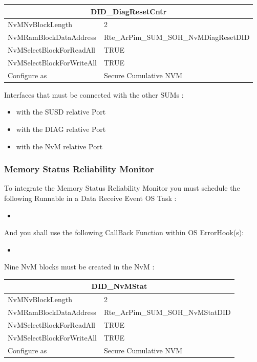 \begin{tabular}{|l|p{8cm}|}\hline
\multicolumn{2}{|c|}{\textbf{DID\_DiagResetCntr}}\\\hline
NvMNvBlockLength&2\\\hline
NvMRamBlockDataAddress&Rte\_ArPim\_SUM\_SOH\_NvMDiagResetDID\\\hline
NvMSelectBlockForReadAll&TRUE\\\hline
NvMSelectBlockForWriteAll&TRUE\\\hline
Configure as&Secure Cumulative NVM\\\hline
\end{tabular}


Interfaces that must be connected with the other SUMs :

\begin{itemize}
    \item {} with the SUSD relative Port
    \item {} with the DIAG relative Port
    \item {} with the NvM relative Port
\end{itemize}

\subsubsection{Memory Status Reliability Monitor}
\label{subsubsection:msrm}
To integrate the Memory Status Reliability Monitor you must schedule the following Runnable in a Data Receive Event OS Task :

\begin{itemize}
    \item {}
\end{itemize}

And you shall use the following CallBack Function within OS ErrorHook(s):

\begin{itemize}
	\item {}
\end{itemize}

Nine NvM blocks must be created in the NvM :

\begin{tabular}{|l|p{8cm}|}\hline
\multicolumn{2}{|c|}{\textbf{DID\_NvMStat}}\\\hline
NvMNvBlockLength&2\\\hline
NvMRamBlockDataAddress&Rte\_ArPim\_SUM\_SOH\_NvMStatDID\\\hline
NvMSelectBlockForReadAll&TRUE\\\hline
NvMSelectBlockForWriteAll&TRUE\\\hline
Configure as&Secure Cumulative NVM\\\hline
\end{tabular}

